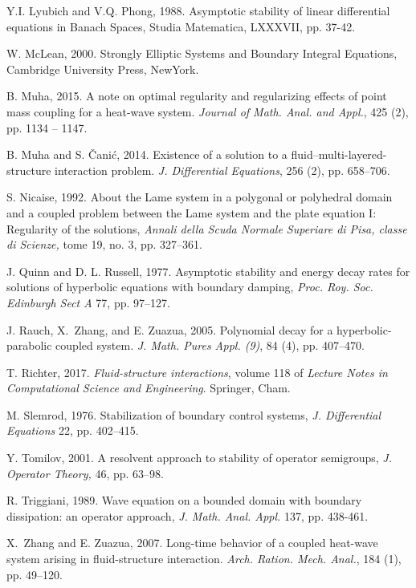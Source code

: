 \documentclass[11pt]{article}
\begin{document}
\begin{thebibliography}{99}
 Y.I. Lyubich and V.Q. Phong, 1988. Asymptotic
stability of linear differential equations in Banach
Spaces, Studia Matematica, LXXXVII, pp. 37-42.

 W. McLean, 2000. Strongly Elliptic Systems and Boundary
Integral Equations, Cambridge University Press, NewYork.

 B. Muha, 2015. A note on optimal
regularity and regularizing effects of point mass  coupling for a heat-wave
system.  {\em Journal of Math. Anal. and Appl.},
425 (2), pp. 1134  -- 1147.

 B. Muha and S. {\v{C}}ani{\'c}, 2014. %
 Existence of a solution to a fluid--multi-layered-structure 
interaction problem. {\em J. Differential Equations},
256 (2), pp. 658--706.

 S. Nicaise, 1992. %
 About the Lame system in a polygonal or polyhedral domain and a coupled problem between the Lame system and the plate equation I: Regularity of the solutions, {\em Annali della Scuda Normale Superiare di Pisa, classe di Scienze, }tome 19, no. 3, pp. 327--361.

 J. Quinn and D. L. Russell, 1977. %
 Asymptotic stability and energy decay rates for solutions of hyperbolic equations with boundary damping, {\em Proc. Roy. Soc. Edinburgh Sect A} 77, pp. 97--127.


 J. Rauch, X.~Zhang, and E. Zuazua, 2005. %
Polynomial decay for a hyperbolic-parabolic coupled system. %
{\em J. Math. Pures Appl. (9)}, 84 (4), pp. 407--470.

 T. Richter, 2017. {\em Fluid-structure
interactions}, volume 118 of \emph{Lecture Notes  in Computational Science
and Engineering}. Springer, Cham.

 M. Slemrod, 1976. Stabilization of boundary control systems, \emph{J. Differential Equations} 22, pp. 402--415.

 Y. Tomilov, 2001. A resolvent approach to stability of operator semigroups, \emph{J. Operator Theory,} 46, pp. 63--98.


 R. Triggiani, 1989. Wave equation on a bounded domain with
boundary dissipation: an operator approach, \textit{J. Math. Anal. Appl.}
137, pp. 438-461.

 X.~Zhang and E. Zuazua, 2007. Long-time
behavior of a coupled heat-wave system arising in fluid-structure
interaction.  {\em Arch. Ration. Mech. Anal.}, 184 (1), pp. 49--120.
\end{thebibliography}
\end{document}
